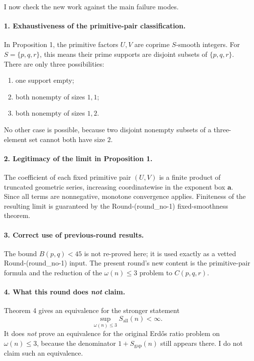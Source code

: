 I now check the new work against the main failure modes.

\paragraph{1. Exhaustiveness of the primitive-pair classification.}
In Proposition 1, the primitive factors \(U,V\) are coprime \(S\)-smooth integers. For \(S=\{p,q,r\}\), this means their prime supports are disjoint subsets of \(\{p,q,r\}\). There are only three possibilities:
\begin{enumerate}
\item one support empty;
\item both nonempty of sizes \(1,1\);
\item both nonempty of sizes \(1,2\).
\end{enumerate}
No other case is possible, because two disjoint nonempty subsets of a three-element set cannot both have size \(2\).

\paragraph{2. Legitimacy of the limit in Proposition 1.}
The coefficient of each fixed primitive pair \((U,V)\) is a finite product of truncated geometric series, increasing coordinatewise in the exponent box \(\mathbf a\). Since all terms are nonnegative, monotone convergence applies. Finiteness of the resulting limit is guaranteed by the Round-(round\_no-1) fixed-smoothness theorem.

\paragraph{3. Correct use of previous-round results.}
The bound \(B(p,q)<45\) is not re-proved here; it is used exactly as a vetted Round-(round\_no-1) input. The present round's new content is the primitive-pair formula and the reduction of the \(\omega(n)\le 3\) problem to \(C(p,q,r)\).

\paragraph{4. What this round does \emph{not} claim.}
Theorem 4 gives an equivalence for the stronger statement
\[
\sup_{\omega(n)\le 3}S_{\mathrm{all}}(n)<\infty.
\]
It does \emph{not} prove an equivalence for the original Erd\H{o}s ratio problem on \(\omega(n)\le 3\), because the denominator \(1+S_{\mathrm{gap}}(n)\) still appears there. I do not claim such an equivalence.

